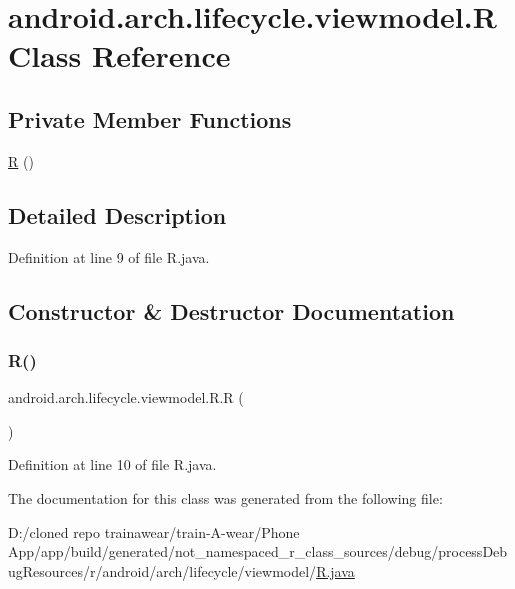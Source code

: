 \hypertarget{classandroid_1_1arch_1_1lifecycle_1_1viewmodel_1_1_r}{}\section{android.\+arch.\+lifecycle.\+viewmodel.\+R Class Reference}
\label{classandroid_1_1arch_1_1lifecycle_1_1viewmodel_1_1_r}
\subsection*{Private Member Functions}
\begin{DoxyCompactItemize}
\item 
\mbox{\hyperlink{classandroid_1_1arch_1_1lifecycle_1_1viewmodel_1_1_r_ae31c7fd717cb03006af7d18aaa68dab8}{R}} ()
\end{DoxyCompactItemize}


\subsection{Detailed Description}


Definition at line 9 of file R.\+java.



\subsection{Constructor \& Destructor Documentation}
\mbox{\label{classandroid_1_1arch_1_1lifecycle_1_1viewmodel_1_1_r_ae31c7fd717cb03006af7d18aaa68dab8}} 
\subsubsection{\texorpdfstring{R()}{R()}}
{\footnotesize\ttfamily android.\+arch.\+lifecycle.\+viewmodel.\+R.\+R (\begin{DoxyParamCaption}{ }\end{DoxyParamCaption})\hspace{0.3cm}{\ttfamily [private]}}



Definition at line 10 of file R.\+java.


\begin{DoxyCode}{0}

\end{DoxyCode}


The documentation for this class was generated from the following file\+:\begin{DoxyCompactItemize}
\item 
D\+:/cloned repo trainawear/train-\/\+A-\/wear/\+Phone App/app/build/generated/not\+\_\+namespaced\+\_\+r\+\_\+class\+\_\+sources/debug/process\+Debug\+Resources/r/android/arch/lifecycle/viewmodel/\mbox{\hyperlink{process_debug_resources_2r_2android_2arch_2lifecycle_2viewmodel_2_r_8java}{R.\+java}}\end{DoxyCompactItemize}
